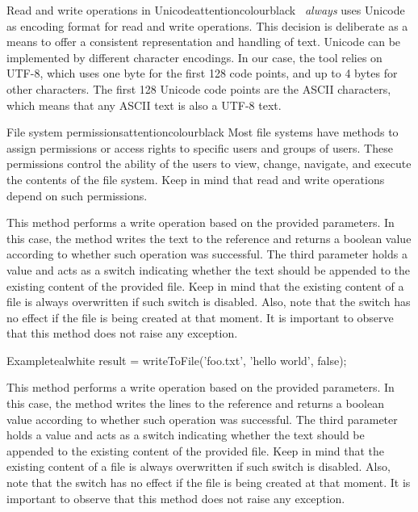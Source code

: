 \begin{description}
\begin{messagebox}{Read and write operations in Unicode}{attentioncolour}{\icattention}{black}
\arara\ \emph{always} uses Unicode as encoding format for read and write operations. This decision is deliberate as a means to offer a consistent representation and handling of text. Unicode can be implemented by different character encodings. In our case, the tool relies on UTF-8, which uses one byte for the first 128 code points, and up to 4 bytes for other characters. The first 128 Unicode code points are the ASCII characters, which means that any ASCII text is also a UTF-8 text.
\end{messagebox}

\begin{messagebox}{File system permissions}{attentioncolour}{\icattention}{black}
Most file systems have methods to assign permissions or access rights to specific users and groups of users. These permissions control the ability of the users to view, change, navigate, and execute the contents of the file system. Keep in mind that read and write operations depend on such permissions.
\end{messagebox}

\item[\mdbox{R}{writeToFile(String reference, String text, boolean append)}{boolean}] This method performs a write operation based on the provided parameters. In this case, the method writes the  text to the  reference and returns a boolean value according to whether such operation was successful. The third parameter holds a  value and acts as a switch indicating whether the text should be appended to the existing content of the provided file. Keep in mind that the existing content of a file is always overwritten if such switch is disabled. Also, note that the switch has no effect if the file is being created at that moment. It is important to observe that this method does not raise any exception.

\begin{codebox}{Example}{teal}{\icnote}{white}
result = writeToFile('foo.txt', 'hello world', false);
\end{codebox}

\item[\mdbox{R}{writeToFile(File file, List<String> lines, boolean append)}{boolean}] This method performs a write operation based on the provided parameters. In this case, the method writes the  lines to the  reference and returns a boolean value according to whether such operation was successful. The third parameter holds a  value and acts as a switch indicating whether the text should be appended to the existing content of the provided file. Keep in mind that the existing content of a file is always overwritten if such switch is disabled. Also, note that the switch has no effect if the file is being created at that moment. It is important to observe that this method does not raise any exception.


\end{description}
